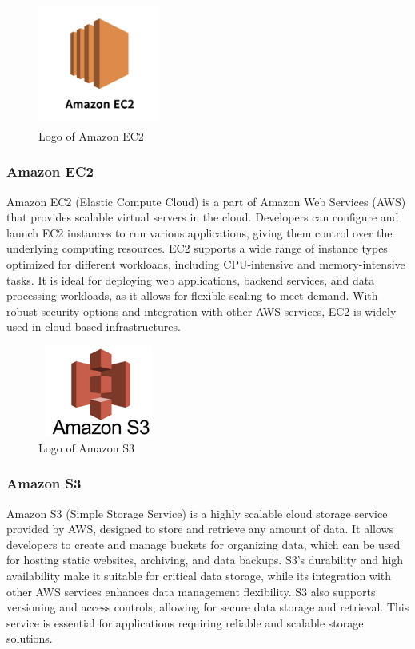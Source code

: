         \begin{figure}[htbp]
            \centerline{\includegraphics[width=4cm, height=4cm]{Images/logo/aws.png}}
            \caption{Logo of Amazon EC2}
            \label{fig}
        \end{figure}
        \subsubsection{Amazon EC2}
            Amazon EC2 (Elastic Compute Cloud) is a part of Amazon Web Services (AWS) that provides scalable virtual servers in the cloud. Developers can configure and launch EC2 instances to run various applications, giving them control over the underlying computing resources. EC2 supports a wide range of instance types optimized for different workloads, including CPU-intensive and memory-intensive tasks. It is ideal for deploying web applications, backend services, and data processing workloads, as it allows for flexible scaling to meet demand. With robust security options and integration with other AWS services, EC2 is widely used in cloud-based infrastructures.

        \begin{figure}[htbp]
            \centerline{\includegraphics[width=4cm, height=3cm]{Images/logo/awss3.png}}
            \caption{Logo of Amazon S3}
            \label{fig}
        \end{figure}
        \subsubsection{Amazon S3}
            Amazon S3 (Simple Storage Service) is a highly scalable cloud storage service provided by AWS, designed to store and retrieve any amount of data. It allows developers to create and manage buckets for organizing data, which can be used for hosting static websites, archiving, and data backups. S3's durability and high availability make it suitable for critical data storage, while its integration with other AWS services enhances data management flexibility. S3 also supports versioning and access controls, allowing for secure data storage and retrieval. This service is essential for applications requiring reliable and scalable storage solutions.


